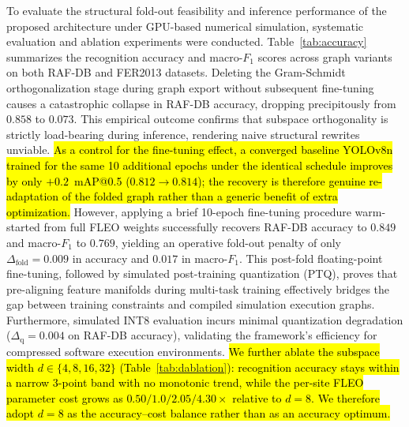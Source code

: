 \documentclass[algorithms,article,submit,moreauthors]{Definitions/mdpi}
\newcommand{\rev}[1]{\hl{#1}}        %
\begin{document}
To evaluate the structural fold-out feasibility and inference performance of the proposed architecture under GPU-based numerical simulation, systematic evaluation and ablation experiments were conducted. Table~\ref{tab:accuracy} summarizes the recognition accuracy and macro-$F_1$ scores across graph variants on both RAF-DB and FER2013 datasets. Deleting the Gram-Schmidt orthogonalization stage during graph export without subsequent fine-tuning causes a catastrophic collapse in RAF-DB accuracy, dropping precipitously from $0.858$ to $0.073$. This empirical outcome confirms that subspace orthogonality is strictly load-bearing during inference, rendering naive structural rewrites unviable. \rev{As a control for the fine-tuning effect, a converged baseline YOLOv8n trained for the same 10 additional epochs under the identical schedule improves by only \mbox{$+0.2$}~mAP@0.5 (\mbox{$0.812 \rightarrow 0.814$}); the recovery is therefore genuine re-adaptation of the folded graph rather than a generic benefit of extra optimization.} However, applying a brief 10-epoch fine-tuning procedure warm-started from full FLEO weights successfully recovers RAF-DB accuracy to $0.849$ and macro-$F_1$ to $0.769$, yielding an operative fold-out penalty of only $\Delta_{\mathrm{fold}} = 0.009$ in accuracy and $0.017$ in macro-$F_1$. This post-fold floating-point fine-tuning, followed by simulated post-training quantization (PTQ), proves that pre-aligning feature manifolds during multi-task training effectively bridges the gap between training constraints and compiled simulation execution graphs. Furthermore, simulated INT8 evaluation incurs minimal quantization degradation ($\Delta_{\mathrm{q}} = 0.004$ on RAF-DB accuracy), validating the framework's efficiency for compressed software execution environments. \rev{We further ablate the subspace width \mbox{$d \in \{4, 8, 16, 32\}$} (Table~\ref{tab:dablation}): recognition accuracy stays within a narrow \mbox{$3$}-point band with no monotonic trend, while the per-site FLEO parameter cost grows as \mbox{$0.50/1.0/2.05/4.30\times$} relative to \mbox{$d = 8$}. We therefore adopt \mbox{$d = 8$} as the accuracy--cost balance rather than as an accuracy optimum.}
\end{document}
